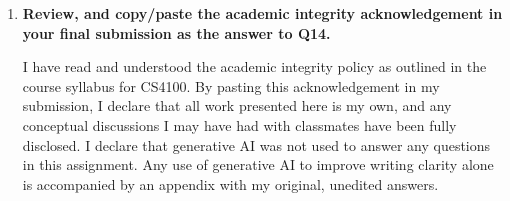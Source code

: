 \documentclass[a4paper]{article}
\begin{document}
\begin{sloppypar}
\begin{enumerate}[start=14,label=Q\arabic*,left=0pt]
    \item \textbf{Review, and copy/paste the academic integrity acknowledgement in your final submission as the answer to Q14.}
    \par I have read and understood the academic integrity policy as outlined in the course syllabus for CS4100. 
    By pasting this acknowledgement in my submission, I declare that all work presented here is my own, 
    and any conceptual discussions I may have had with classmates have been fully disclosed. I declare that generative AI 
    was not used to answer any questions in this assignment. Any use of generative AI to improve writing clarity 
    alone is accompanied by an appendix with my original, unedited answers.
\end{enumerate}
\end{sloppypar}



\end{document}
